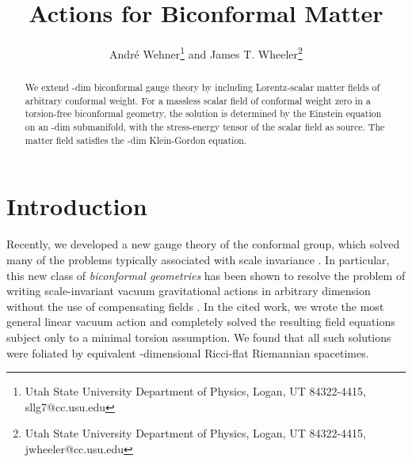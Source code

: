 \documentclass[a4paper,a4paper]{article}
\begin{document}
\title{Actions for Biconformal Matter}
\author{Andr\'{e} Wehner\footnote{Utah State University Department of Physics, Logan, UT 84322-4415, sllg7@cc.usu.edu}  and James T. Wheeler\footnote{Utah State University Department of Physics, Logan, UT 84322-4415, jwheeler@cc.usu.edu}}
\maketitle

\begin{abstract}
We extend \coordHE{}-dim biconformal gauge theory by including
Lorentz-scalar matter fields of arbitrary conformal weight. For a massless
scalar field of conformal weight zero in a torsion-free biconformal
geometry, the solution is determined by the Einstein equation on an \coordHE{}%
-dim submanifold, with the stress-energy tensor of the scalar field
as source. The matter field satisfies the \coordHE{}-dim Klein-Gordon
equation.
\end{abstract}

\section{Introduction}

Recently, we developed a new gauge theory of the conformal group, which
solved many of the problems typically associated with scale invariance \cite
{New Conformal Gauging Paper}. In particular, this new class of \textit{%
biconformal geometries} has been shown to resolve the problem of writing
scale-invariant vacuum gravitational actions in arbitrary dimension without
the use of compensating fields \cite{WW}. In the cited work, we wrote the
most general linear vacuum action and completely solved the resulting field
equations subject only to a minimal torsion assumption. We found that all
such solutions were foliated by equivalent \coordHE{}-dimensional Ricci-flat
Riemannian spacetimes.
\end{document}
